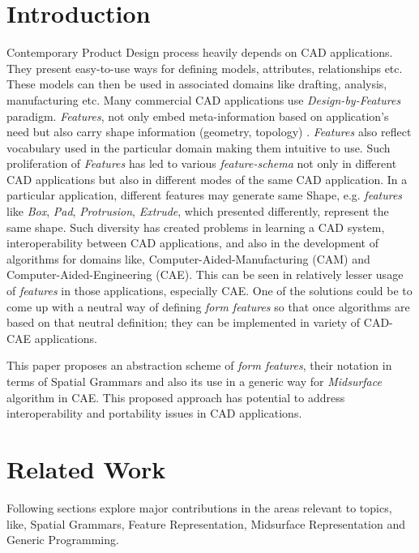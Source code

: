 
\section{Introduction}

Contemporary Product Design process heavily depends on CAD applications. They present easy-to-use ways for defining models, attributes, relationships etc.  These models can then be used in associated domains like drafting, analysis, manufacturing etc. Many commercial CAD applications use {\em Design-by-Features} paradigm. {\em Features}, not only embed meta-information based on application's need  but also carry shape information (geometry, topology)  \cite{Brunetti2003}. {\em Features} also reflect vocabulary used in the particular domain making them intuitive to use. Such proliferation of {\em Features} has led to various {\em feature-schema} not only in different CAD applications but also in different modes of the same CAD application. In a particular application, different features may generate same Shape, e.g. {\em features} like {\em Box}, {\em Pad}, {\em Protrusion}, {\em Extrude}, which presented differently, represent the same shape. Such diversity has created problems in learning a CAD system, interoperability between CAD applications, and also in the development of algorithms for domains like, Computer-Aided-Manufacturing (CAM) and Computer-Aided-Engineering (CAE). This can be seen in relatively lesser usage of {\em features} in those applications, especially CAE.  One of the solutions could be to come up with a neutral way of defining {\em form features} so that once algorithms are based on that neutral definition; they can be implemented in variety of CAD-CAE applications. 

This paper proposes an abstraction scheme of {\em form features}, their notation in terms of Spatial Grammars and also its use in a generic way for {\em Midsurface} algorithm in CAE. This proposed approach has potential to address interoperability and portability issues in CAD applications.

\section{Related Work}

	Following sections explore major contributions in the areas relevant to topics, like, Spatial Grammars, Feature Representation, Midsurface Representation and Generic Programming.

